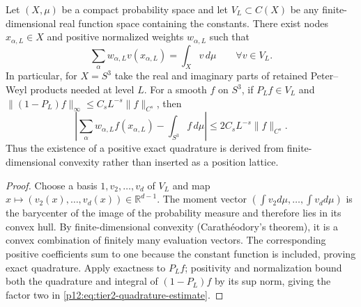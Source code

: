 \documentclass[12pt,a4paper]{article}
\begin{document}
\begin{proposition}
\label{p12:prop:tier2-quadrature}
Let \((X,\mu)\) be a compact probability space and let
\(V_L\subset C(X)\) be any finite-dimensional real function space containing
the constants.  There exist nodes \(x_{\alpha,L}\in X\) and positive
normalized weights \(w_{\alpha,L}\) such that
\[
\sum_\alpha w_{\alpha,L}v(x_{\alpha,L})=\int_Xv\,d\mu
\qquad\forall v\in V_L.
\]
In particular, for \(X=S^3\) take the real and imaginary parts of retained
Peter--Weyl products needed at level \(L\).  For a smooth \(f\) on \(S^3\),
if \(P_Lf\in V_L\) and
\(\|(1-P_L)f\|_\infty\le C_sL^{-s}\|f\|_{C^s}\), then
\begin{equation}
\label{p12:eq:tier2-quadrature-estimate}
\left|\sum_\alpha w_{\alpha,L}f(x_{\alpha,L})-\int_{S^3}f\,d\mu\right|
\le 2C_sL^{-s}\|f\|_{C^s}.
\end{equation}
Thus the existence of a positive exact quadrature is derived from finite-dimensional convexity rather than inserted as a position lattice.
\end{proposition}
\begin{proof}
Choose a basis \(1,v_2,\ldots,v_d\) of \(V_L\) and map \(x\mapsto(v_2(x),\ldots,v_d(x))\in\mathbb R^{d-1}\).  The moment vector \((\int v_2d\mu,\ldots,\int v_dd\mu)\) is the barycenter of the image of the probability measure and therefore lies in its convex hull.  By finite-dimensional convexity (Carath\'eodory's theorem), it is a convex combination of finitely many evaluation vectors.  The corresponding positive coefficients sum to one because the constant function is included, proving exact quadrature.  Apply exactness to \(P_Lf\); positivity and normalization bound both the quadrature and integral of \((1-P_L)f\) by its sup norm, giving the factor two in \eqref{p12:eq:tier2-quadrature-estimate}.
\end{proof}
\end{document}
